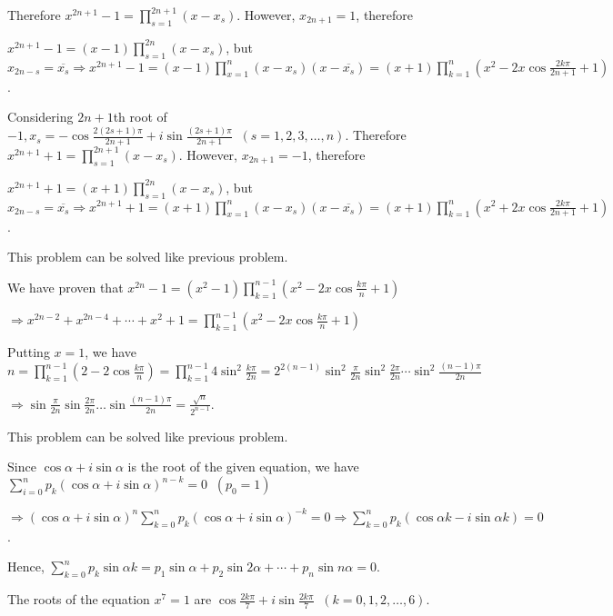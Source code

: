   Therefore $x^{2n + 1} - 1 = \displaystyle\prod_{s = 1}^{2n + 1}(x - x_s)$. However, $x_{2n + 1} = 1$,
  therefore

  $x^{2n + 1} - 1 = \displaystyle(x - 1)\prod_{s=1}^{2n}(x - x_s)$, but $x_{2n - s} = \displaystyle\overline{x_s}
  \Rightarrow x^{2n + 1} - 1 = (x - 1)\prod_{x=1}^{n}(x - x_s)(x - \overline{x_s}) = (x +
  1)\displaystyle\prod_{k = 1}^n\left(x^2 - 2x\cos\frac{2k\pi}{2n + 1} + 1\right)$.
\item Considering $2n + 1$th root of $-1, x_s = -\cos\frac{2(2s + 1)\pi}{2n + 1} + i\sin\frac{(2s +
  1)\pi}{2n + 1}\;\;(s = 1, 2, 3, \ldots, n)$.
  Therefore $x^{2n + 1} + 1 = \displaystyle\prod_{s = 1}^{2n + 1}(x - x_s)$. However, $x_{2n + 1} = -1$,
  therefore

  $x^{2n + 1} + 1 = \displaystyle(x + 1)\prod_{s=1}^{2n}(x - x_s)$, but $x_{2n - s} = \displaystyle\overline{x_s}
  \Rightarrow x^{2n + 1} + 1 = (x + 1)\prod_{x=1}^{n}(x - x_s)(x - \overline{x_s}) = (x +
  1)\displaystyle\prod_{k = 1}^n\left(x^2 + 2x\cos\frac{2k\pi}{2n + 1} + 1\right)$.
\item This problem can be solved like previous problem.
\item We have proven that $x^{2n} - 1 = (x^2 - 1)\displaystyle\prod_{k = 1}^{n - 1}\left(x^2 -
  2x\cos\frac{k\pi}{n} + 1\right)$

  $\Rightarrow x^{2n - 2} + x^{2n - 4} + \cdots + x^2 + 1 = \displaystyle\prod_{k = 1}^{n - 1}\left(x^2 -
  2x\cos\frac{k\pi}{n} + 1\right)$

  Putting $x = 1$, we have $n = \displaystyle\prod_{k = 1}^{n - 1}(2 - 2\cos\frac{k\pi}{n}) = \prod_{k=1}^{n
  - 1}4\sin^2\frac{k\pi}{2n} = 2^{2(n - 1)}\sin^2\frac{\pi}{2n}\sin^2\frac{2\pi}{2n}\cdots\sin^2\frac{(n -
    1)\pi}{2n}$

  $\Rightarrow \sin\frac{\pi}{2n}\sin\frac{2\pi}{2n}\ldots \sin\frac{(n - 1)\pi}{2n} = \frac{\sqrt{n}}{2^{n
      - 1}}$.
\item This problem can be solved like previous problem.
\item Since $\cos\alpha + i\sin\alpha$ is the root of the given equation, we have $\displaystyle\sum_{i =
  0}^np_k(\cos\alpha + i\sin\alpha)^{n - k} = 0\;\;(p_0 = 1)$

  $\Rightarrow \displaystyle(\cos\alpha + i\sin\alpha)^n\sum_{k=0}^np_k(\cos\alpha + i\sin\alpha)^{-k} = 0 \Rightarrow
  \sum_{k= 0}^np_k(\cos\alpha k - i\sin\alpha k) = 0$.

  Hence, $\displaystyle\sum_{k= 0}^np_k\sin\alpha k = p_1\sin\alpha + p_2\sin2\alpha + \cdots + p_n\sin
  n\alpha = 0$.
\item The roots of the equation $x^7 = 1$ are $\cos\frac{2k\pi}{7} + i\sin\frac{2k\pi}{7}\;\;(k = 0, 1, 2,
  \ldots, 6)$.


